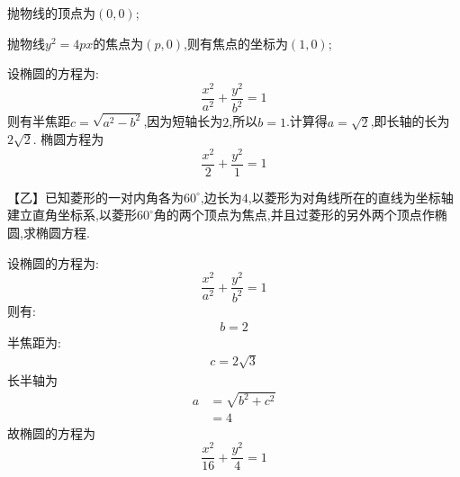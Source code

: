 \begin{questions}
\begin{solution}
		\begin{cenum}
			\item 抛物线的顶点为$(0,0)$;
			\item 抛物线$y^2=4px$的焦点为$(p,0)$,则有焦点的坐标为$(1,0)$;
			\item 设椭圆的方程为:
			      \begin{equation*}
				      \frac{x^2}{a^2} + \frac{y^2}{b^2} = 1
			      \end{equation*}
			      则有半焦距$c=\sqrt{a^2-b^2}$,因为短轴长为$2$,所以$b=1$.计算得$a=\sqrt{2}$,即长轴的长为$2\sqrt{2}$.
			      椭圆方程为
			      \begin{equation*}
				      \frac{x^2}{2} + \frac{y^2}{1} = 1
			      \end{equation*}
		\end{cenum}
	\end{solution}

	【乙】已知菱形的一对内角各为$60^\circ$,边长为$4$,以菱形为对角线所在的直线为坐标轴建立直角坐标系,以菱形$60^\circ$角的两个顶点为焦点,并且过菱形的另外两个顶点作椭圆,求椭圆方程.

	\begin{solution}
		\begin{center}
		\end{center}
		设椭圆的方程为:
		\begin{equation*}
			\frac{x^2}{a^2} + \frac{y^2}{b^2} = 1
		\end{equation*}
		则有:
		\begin{align*}
			b = 2
		\end{align*}
		半焦距为:
		\begin{align*}
			c = 2\sqrt{3}
		\end{align*}
		长半轴为
		\begin{align*}
			a & = \sqrt{b^2 + c^2} \\
			  & = 4
		\end{align*}
		故椭圆的方程为
		\begin{equation*}
			\frac{x^2}{16} + \frac{y^2}{4} = 1
		\end{equation*}
	\end{solution}


\end{questions}
